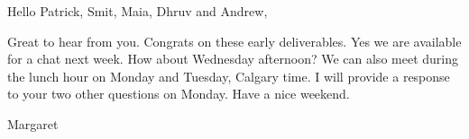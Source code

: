 Hello Patrick, Smit, Maia, Dhruv and Andrew,

Great to hear from you. Congrats on these early deliverables. Yes we are available for a chat next week. How about Wednesday afternoon? We can also meet during the lunch hour on Monday and Tuesday, Calgary time. I will provide a response to your two other questions on Monday. Have a nice weekend.

Margaret
